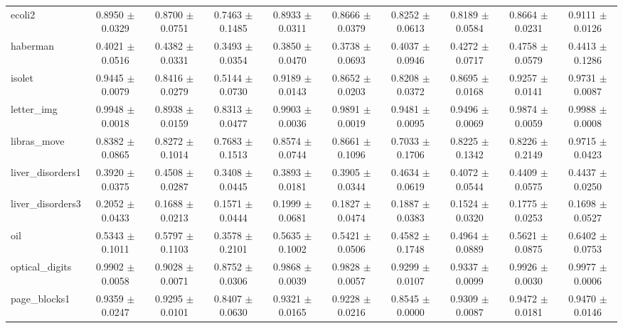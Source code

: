 \begin{table*}[htbp]
\begin{tabular}{lccccccccc}
            ecoli2 & 0.8950 $\pm$ 0.0329 & 0.8700 $\pm$ 0.0751 & 0.7463 $\pm$ 0.1485 & 0.8933 $\pm$ 0.0311 & 0.8666 $\pm$ 0.0379 & 0.8252 $\pm$ 0.0613 & 0.8189 $\pm$ 0.0584 & 0.8664 $\pm$ 0.0231 & 0.9111 $\pm$ 0.0126 \\ 
            haberman & 0.4021 $\pm$ 0.0516 & 0.4382 $\pm$ 0.0331 & 0.3493 $\pm$ 0.0354 & 0.3850 $\pm$ 0.0470 & 0.3738 $\pm$ 0.0693 & 0.4037 $\pm$ 0.0946 & 0.4272 $\pm$ 0.0717 & 0.4758 $\pm$ 0.0579 & 0.4413 $\pm$ 0.1286 \\ 
            isolet & 0.9445 $\pm$ 0.0079 & 0.8416 $\pm$ 0.0279 & 0.5144 $\pm$ 0.0730 & 0.9189 $\pm$ 0.0143 & 0.8652 $\pm$ 0.0203 & 0.8208 $\pm$ 0.0372 & 0.8695 $\pm$ 0.0168 & 0.9257 $\pm$ 0.0141 & 0.9731 $\pm$ 0.0087 \\ 
            letter\_img & 0.9948 $\pm$ 0.0018 & 0.8938 $\pm$ 0.0159 & 0.8313 $\pm$ 0.0477 & 0.9903 $\pm$ 0.0036 & 0.9891 $\pm$ 0.0019 & 0.9481 $\pm$ 0.0095 & 0.9496 $\pm$ 0.0069 & 0.9874 $\pm$ 0.0059 & 0.9988 $\pm$ 0.0008 \\ 
            libras\_move & 0.8382 $\pm$ 0.0865 & 0.8272 $\pm$ 0.1014 & 0.7683 $\pm$ 0.1513 & 0.8574 $\pm$ 0.0744 & 0.8661 $\pm$ 0.1096 & 0.7033 $\pm$ 0.1706 & 0.8225 $\pm$ 0.1342 & 0.8226 $\pm$ 0.2149 & 0.9715 $\pm$ 0.0423 \\ 
            liver\_disorders1 & 0.3920 $\pm$ 0.0375 & 0.4508 $\pm$ 0.0287 & 0.3408 $\pm$ 0.0445 & 0.3893 $\pm$ 0.0181 & 0.3905 $\pm$ 0.0344 & 0.4634 $\pm$ 0.0619 & 0.4072 $\pm$ 0.0544 & 0.4409 $\pm$ 0.0575 & 0.4437 $\pm$ 0.0250 \\ 
            liver\_disorders3 & 0.2052 $\pm$ 0.0433 & 0.1688 $\pm$ 0.0213 & 0.1571 $\pm$ 0.0444 & 0.1999 $\pm$ 0.0681 & 0.1827 $\pm$ 0.0474 & 0.1887 $\pm$ 0.0383 & 0.1524 $\pm$ 0.0320 & 0.1775 $\pm$ 0.0253 & 0.1698 $\pm$ 0.0527 \\ 
            oil & 0.5343 $\pm$ 0.1011 & 0.5797 $\pm$ 0.1103 & 0.3578 $\pm$ 0.2101 & 0.5635 $\pm$ 0.1002 & 0.5421 $\pm$ 0.0506 & 0.4582 $\pm$ 0.1748 & 0.4964 $\pm$ 0.0889 & 0.5621 $\pm$ 0.0875 & 0.6402 $\pm$ 0.0753 \\ 
            optical\_digits & 0.9902 $\pm$ 0.0058 & 0.9028 $\pm$ 0.0071 & 0.8752 $\pm$ 0.0306 & 0.9868 $\pm$ 0.0039 & 0.9828 $\pm$ 0.0057 & 0.9299 $\pm$ 0.0107 & 0.9337 $\pm$ 0.0099 & 0.9926 $\pm$ 0.0030 & 0.9977 $\pm$ 0.0006 \\ 
            page\_blocks1 & 0.9359 $\pm$ 0.0247 & 0.9295 $\pm$ 0.0101 & 0.8407 $\pm$ 0.0630 & 0.9321 $\pm$ 0.0165 & 0.9228 $\pm$ 0.0216 & 0.8545 $\pm$ 0.0000 & 0.9309 $\pm$ 0.0087 & 0.9472 $\pm$ 0.0181 & 0.9470 $\pm$ 0.0146 \\ 

\end{tabular}
\end{table*}
